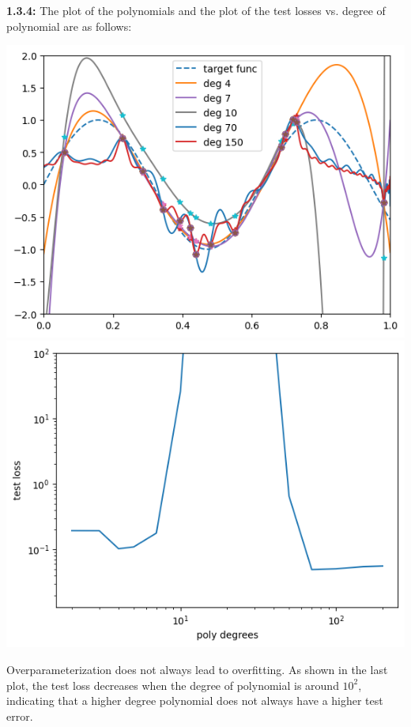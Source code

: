 \documentclass[12pt]{article}
\begin{document}
\textbf{1.3.4:} The plot of the polynomials and the plot of the test losses vs. degree of polynomial are as follows:
\begin{center}
    \includegraphics[scale=.75]{1.3.4-1.png}
    \includegraphics[scale=.75]{1.3.4-2.png}
\end{center}

Overparameterization does not always lead to overfitting. As shown in the last plot, the test loss decreases when the degree of polynomial is around $10^2$, indicating that a higher degree polynomial does not always have a higher test error.
\end{document}
